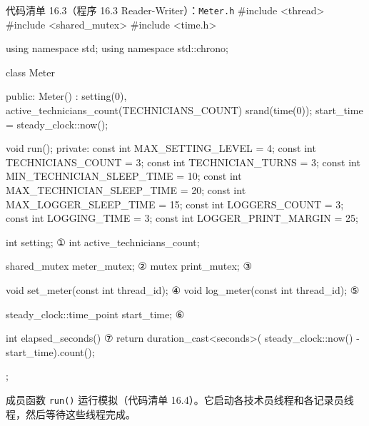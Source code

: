 \begin{codeboxt}{代码清单 16.3（程序 16.3 Reader-Writer）：\texttt{Meter.h}}
#include <thread>
#include <shared_mutex>
#include <time.h>

using namespace std;
using namespace std::chrono;

class Meter
{
public:
    Meter()
        : setting(0), active_technicians_count(TECHNICIANS_COUNT)
    {
        srand(time(0));
        start_time = steady_clock::now();
    }

    void run();
private:
    const int MAX_SETTING_LEVEL         =  4;
    const int TECHNICIANS_COUNT         =  3;
    const int TECHNICIAN_TURNS          =  3;
    const int MIN_TECHNICIAN_SLEEP_TIME = 10;
    const int MAX_TECHNICIAN_SLEEP_TIME = 20;
    const int MAX_LOGGER_SLEEP_TIME     = 15;
    const int LOGGERS_COUNT             =  3;
    const int LOGGING_TIME              =  3;
    const int LOGGER_PRINT_MARGIN       = 25;

    int setting;                            ①
    int active_technicians_count;

    shared_mutex meter_mutex;               ②
    mutex print_mutex;                      ③

    void set_meter(const int thread_id);    ④
    void log_meter(const int thread_id);    ⑤

    steady_clock::time_point start_time;    ⑥
    
    int elapsed_seconds()                   ⑦
    {
        return duration_cast<seconds>(
                        steady_clock::now() - start_time).count();
    }
};
\end{codeboxt}
\par
{}\par
{}\par
{}\par
{}\par
{}\par
{}\par

成员函数 \texttt{run()} 运行模拟（代码清单 16.4）。它启动各技术员线程和各记录员线程，然后等待这些线程完成。

